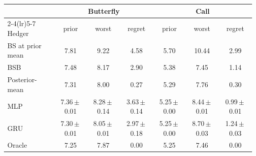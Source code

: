 \begin{tabular}{@{}lcccccc@{}}
\toprule
 & \multicolumn{3}{c}{Butterfly} & \multicolumn{3}{c}{Call} \\
\cmidrule(lr){2-4}\cmidrule(lr){5-7}
Hedger & prior & worst & regret & prior & worst & regret \\
\midrule
BS at prior mean & 7.81 & 9.22 & 4.58 & 5.70 & 10.44 & 2.99 \\
BSB & 7.48 & 8.17 & 2.90 & 5.38 & 7.45 & 1.14 \\
Posterior-mean & 7.31 & 8.00 & 0.27 & 5.29 & 7.76 & 0.30 \\
MLP & 7.36\,$\pm$\,0.01 & 8.28\,$\pm$\,0.14 & 3.63\,$\pm$\,0.14 & 5.25\,$\pm$\,0.00 & 8.44\,$\pm$\,0.01 & 0.99\,$\pm$\,0.01 \\
GRU & 7.30\,$\pm$\,0.01 & 8.05\,$\pm$\,0.01 & 2.97\,$\pm$\,0.18 & 5.25\,$\pm$\,0.00 & 8.70\,$\pm$\,0.03 & 1.24\,$\pm$\,0.03 \\
Oracle & 7.25 & 7.87 & 0.00 & 5.25 & 7.46 & 0.00 \\
\bottomrule
\end{tabular}
